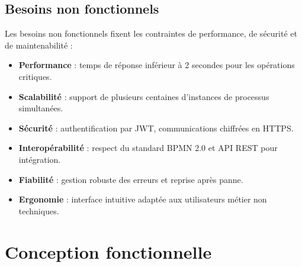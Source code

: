 \subsection{Besoins non fonctionnels}
Les besoins non fonctionnels fixent les contraintes de performance, de sécurité et de maintenabilité :
\begin{itemize}
    \item \textbf{Performance} : temps de réponse inférieur à 2 secondes pour les opérations critiques.
    \item \textbf{Scalabilité} : support de plusieurs centaines d’instances de processus simultanées.
    \item \textbf{Sécurité} : authentification par JWT, communications chiffrées en HTTPS.
    \item \textbf{Interopérabilité} : respect du standard BPMN 2.0 et API REST pour intégration.
    \item \textbf{Fiabilité} : gestion robuste des erreurs et reprise après panne.
    \item \textbf{Ergonomie} : interface intuitive adaptée aux utilisateurs métier non techniques.
\end{itemize}

\section{Conception fonctionnelle}

